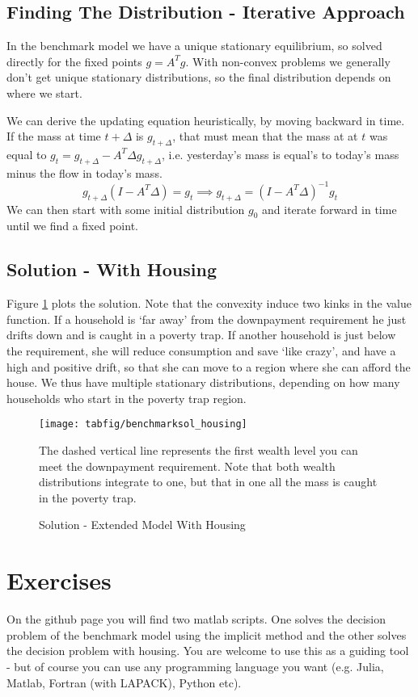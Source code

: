 \documentclass[12pt]{article}
\DeclareMathOperator{\1}{\mathbbm{1}}
\begin{document}
\subsection{Finding The Distribution - Iterative Approach}
In the benchmark model we have a unique stationary equilibrium, so solved directly for the fixed points $g=A^Tg$. With non-convex problems we generally don't get unique stationary distributions, so the final distribution depends on where we start.

We can derive the updating equation heuristically, by moving backward in time. If the mass at time $t+\Delta$ is $g_{t+\Delta}$, that must mean that the mass at at $t$ was equal to $g_t=g_{t+\Delta} - A^T\Delta g_{t+\Delta}$, i.e. yesterday's mass is equal's to today's mass minus the flow in today's mass.
\begin{equation}
g_{t+\Delta}(I - A^T\Delta)=g_t \implies g_{t+\Delta}  = (I - A^T\Delta)^{-1}g_t
\end{equation}
We can then start with some initial distribution $g_0$ and iterate forward in time until we find a fixed point. 
\subsection{Solution - With Housing}
Figure \ref{fig:solHousing} plots the solution. Note that the convexity induce two kinks in the value function. If a household is `far away' from the downpayment requirement he just drifts down and is caught in a poverty trap. If another household is just below the requirement, she will reduce consumption and save `like crazy', and have a high and positive drift, so that she can move to a region where she can afford the house. We thus have multiple stationary distributions, depending on how many households who start in the poverty trap region.
\begin{figure}

\begin{center}
\caption{Solution - Extended Model With Housing}
\label{fig:solHousing}
\texttt{[image: tabfig/benchmarksol\_housing]}
\end{center}
{\small 

The dashed vertical line represents the first wealth level you can meet the downpayment requirement. Note that both wealth distributions integrate to one, but that in one all the mass is caught in the poverty trap. }
\end{figure}

\section*{Exercises}
On the github page you will find two matlab scripts. One solves the decision problem of the benchmark model using the implicit method and the other solves the decision problem with housing. You are welcome to use this as a guiding tool - but of course you can use any programming language you want (e.g. Julia, Matlab, Fortran (with LAPACK), Python etc).
\end{document}
